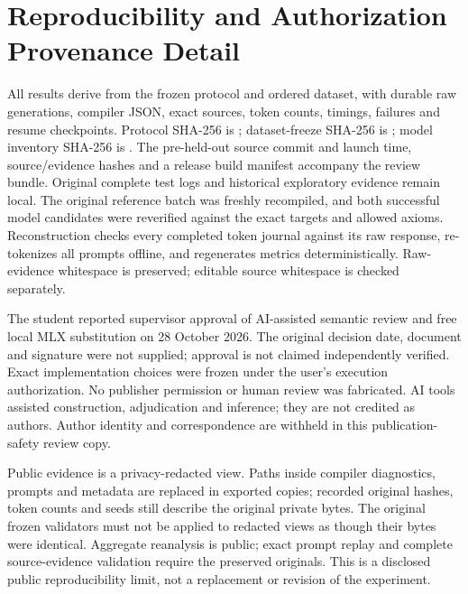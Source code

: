 \documentclass[runningheads,a4paper]{llncs}
\begin{document}
\section{Reproducibility and Authorization Provenance Detail}
\label{app:repro}
All results derive from the frozen protocol and ordered dataset, with durable
raw generations, compiler JSON, exact sources, token counts, timings, failures
and resume checkpoints. Protocol SHA-256 is
; dataset-freeze SHA-256 is
; model inventory SHA-256 is
. The pre-held-out source commit and launch time,
source/evidence hashes and a release build manifest accompany the review bundle.
Original complete test logs and historical exploratory evidence remain local.
The original reference batch was freshly recompiled, and both successful model
candidates were reverified against the exact targets and allowed axioms.
Reconstruction checks every completed token journal against its raw response,
re-tokenizes all prompts offline, and regenerates metrics deterministically.
Raw-evidence whitespace is preserved; editable source whitespace is checked separately.

The student reported supervisor approval of AI-assisted semantic review and
free local MLX substitution on 28 October 2026. The original decision date,
document and signature were not supplied; approval is not claimed independently
verified. Exact implementation choices were frozen under the user's execution
authorization. No publisher permission or human review was fabricated. AI tools
assisted construction, adjudication and inference; they are not credited as
authors. Author identity and correspondence are withheld in this publication-safety review copy.

Public evidence is a privacy-redacted view. Paths inside compiler diagnostics,
prompts and metadata are replaced in exported copies; recorded original hashes,
token counts and seeds still describe the original private bytes. The original
frozen validators must not be applied to redacted views as though their bytes
were identical. Aggregate reanalysis is public; exact prompt replay and complete
source-evidence validation require the preserved originals. This is a disclosed
public reproducibility limit, not a replacement or revision of the experiment.

\clearpage


\end{document}
